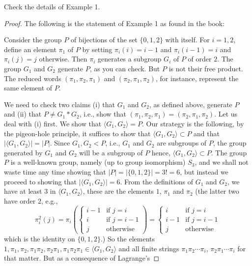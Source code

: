 \begin{problem}[Munkres \S68, Ex.\,1]
Check the details of Example 1.
\end{problem}
\begin{proof}
The following is the statement of Example 1 as found in the book:
\begin{example*}[1]
Consider the group $P$ of bijections of the set $\{0,1,2\}$ with
itself. For $i=1,2$, define an element $\pi_1$ of $P$ by setting
$\pi_i(i)=i-1$ and $\pi_i(i-1)=i$ and $\pi_i(j)=j$ otherwise. Then $\pi_i$
generates a subgroup $G_i$ of $P$ of order $2$. The group $G_1$ and $G_2$
generate $P$, as you can check. But $P$ is not their free product. The
reduced words $(\pi_1,\pi_2,\pi_1)$ and $(\pi_2,\pi_1,\pi_2)$, for
instance, represent the same element of $P$.
\end{example*}
We need to check two claims (i) that $G_1$ and $G_2$, as defined above,
generate $P$ and (ii) that $P\neq G_1*G_2$, i.e., show that
$(\pi_1,\pi_2,\pi_1)=(\pi_2,\pi_1,\pi_2)$. Let us deal with (i) first. We
show that $\langle G_1,G_2 \rangle=P$. Our strategy is the following, by
the pigeon-hole principle, it suffices to show that $\langle  G_1,G_2
\rangle\subset P$ and that $|\langle G_1,G_2\rangle|=|P|$. Since
$G_1,G_2<P$, i.e., $G_1$ and $G_2$ are subgroups of $P$, the group
generated by $G_1$ and $G_2$ will be a subgroup of $P$ hence, $\langle
G_1,G_2 \rangle\subset P$. The group $P$ is a well-known group, namely (up
to group isomorphism) $S_3$, and we shall not waste time any time showing
that $|P|=|\{0,1,2\}|=3!=6$, but instead we proceed to showing that
$|\langle G_1,G_2 \rangle|=6$. From the definitions of $G_1$ and $G_2$, we
have at least $3$ in $\langle  G_1,G_2 \rangle$, these are the elements
$1$, $\pi_1$ and $\pi_2$ (the latter two have order $2$, e.g.,
\[
\pi_i^2(j)=
\pi_i\left(
\begin{cases}
i-1&\text{if $j=i$}\\
i&\text{if $j=i-1$}\\
j&\text{otherwise}
\end{cases}
\right)
=
\begin{cases}
i&\text{if $j=i$}\\
i-1&\text{if $j=i-1$}\\
j&\text{otherwise}
\end{cases}
\]
which is the identity on $\{0,1,2\}$.) So the elements
$1,\pi_1,\pi_2,\pi_1\pi_2,\pi_2\pi_1,\pi_1\pi_2\pi_1\in\langle
G_1,G_2\rangle$ and all finite strings $\pi_1\pi_2\cdots\pi_i$,
$\pi_2\pi_1\cdots\pi_i$ for that matter. But as a consequence of Lagrange's

\end{proof}
